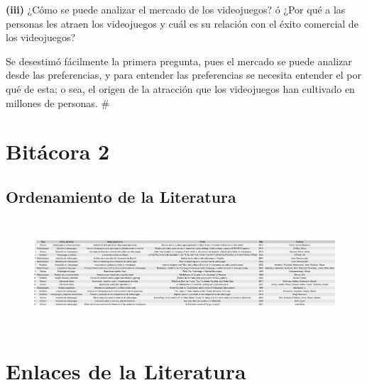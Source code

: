 \documentclass[
  letterpaper,
  DIV=11,
  numbers=noendperiod]{scrreprt}
\begin{document}
\textbf{(iii)} ¿Cómo se puede analizar el mercado de los videojuegos? ó
¿Por qué a las personas les atraen los videojuegos y cuál es su relación
con el éxito comercial de los videojuegos?

Se desestimó fácilmente la primera pregunta, pues el mercado se puede
analizar desde las preferencias, y para entender las preferencias se
necesita entender el por qué de esta; o sea, el origen de la atracción
que los videojuegos han cultivado en millones de personas. \#


\hypertarget{bituxe1cora-2}{%
\chapter{Bitácora 2}\label{bituxe1cora-2}}

\hypertarget{ordenamiento-de-la-literatura}{%
\section{Ordenamiento de la
Literatura}\label{ordenamiento-de-la-literatura}}

\begin{figure}

{\centering \includegraphics[width=6.59375in,height=1.5625in]{./imagenes/literatura.png}

}

\end{figure}


\hypertarget{enlaces-de-la-literatura}{%
\chapter{Enlaces de la Literatura}\label{enlaces-de-la-literatura}}
\end{document}

